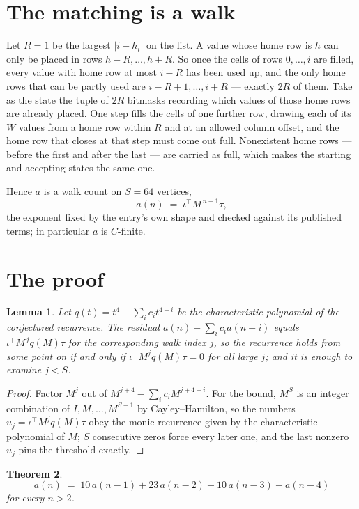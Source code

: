 \documentclass[11pt,a4paper]{article}
\theoremstyle{plain}
\newtheorem{theorem}{Theorem}
\newtheorem{lemma}[theorem]{Lemma}
\theoremstyle{definition}
\begin{document}
\section{The matching is a walk}

Let $R=1$ be the largest $|i-h_i|$ on the list. A value whose home row is $h$ can only be
placed in rows $h-R,\dots,h+R$. So once the cells of rows $0,\dots,i$ are filled, every
value with home row at most $i-R$ has been used up, and the only home rows that can be
partly used are $i-R+1,\dots,i+R$ --- exactly $2R$ of them. Take as the state the tuple of
$2R$ bitmasks recording which values of those home rows are already placed. One step fills
the cells of one further row, drawing each of its $W$ values from a home row within $R$
and at an allowed column offset, and the home row that closes at that step must come out
full. Nonexistent home rows --- before the first and after the last --- are carried as
full, which makes the starting and accepting states the same one.

Hence $a$ is a walk count on $S=64$ vertices,
\[
a(n)\;=\;\iota^{\!\top}M^{\,n+1}\tau ,
\]
the exponent fixed by the entry's own shape and checked against its published terms; in
particular $a$ is $C$-finite.

\section{The proof}

\begin{lemma}\label{lem:crit}
Let $q(t)=t^{4}-\sum_i c_it^{4-i}$ be the characteristic polynomial of the
conjectured recurrence. The residual $a(n)-\sum_ic_ia(n-i)$ equals
$\iota^{\!\top}M^{\,j}q(M)\tau$ for the corresponding walk index $j$, so the recurrence
holds from some point on if and only if $\iota^{\!\top}M^{j}q(M)\tau=0$ for all large $j$;
and it is enough to examine $j<S$.
\end{lemma}

\begin{proof}
Factor $M^{j}$ out of $M^{j+4}-\sum_ic_iM^{j+4-i}$. For the bound, $M^{S}$
is an integer combination of $I,M,\dots,M^{S-1}$ by Cayley--Hamilton, so the numbers
$u_j=\iota^{\!\top}M^{j}q(M)\tau$ obey the monic recurrence given by the characteristic
polynomial of $M$; $S$ consecutive zeros force every later one, and the last nonzero $u_j$
pins the threshold exactly.
\end{proof}

\begin{theorem}
\[
a(n)\;=\;10\,a(n-1) + 23\,a(n-2) - 10\,a(n-3) - a(n-4)
\]
for every $n>2$.
\end{theorem}
\end{document}
